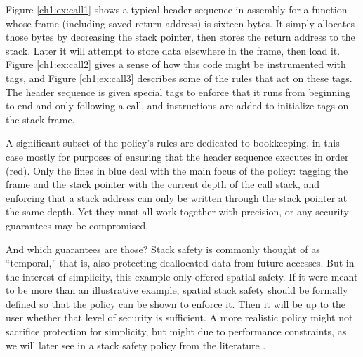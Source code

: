 Figure \ref{ch1:ex:call1} shows a typical header sequence in assembly for a function whose frame
(including saved return address) is sixteen bytes. It simply allocates those bytes by decreasing
the stack pointer, then stores the return address to the stack. Later it will attempt to store data
elsewhere in the frame, then load it. Figure \ref{ch1:ex:call2} gives a sense of how
this code might be instrumented with tags, and Figure \ref{ch1:ex:call3} describes some of
the rules that act on these tags. The header sequence is given special tags to enforce
that it runs from beginning to end and only following a call, and instructions are added
to initialize tags on the stack frame.

A significant subset of the policy's rules are dedicated to bookkeeping, in this case
mostly for purposes of ensuring that the header sequence executes in order (red).
Only the lines in blue deal with the main focus of the policy:
tagging the frame and the stack pointer with the current depth of the call stack, and enforcing
that a stack address can only be written through the stack pointer at the same depth.
Yet they must all work together with precision, or any security guarantees may be compromised.

And which guarantees are those? Stack safety is commonly thought of as ``temporal,'' that is,
also protecting deallocated data from future accesses. But in the interest of simplicity,
this example only offered spatial safety. If it were meant to be more than an illustrative
example, spatial stack safety should be formally defined so that the policy can be shown
to enforce it. Then it will be up to the user whether that level of security is sufficient.
A more realistic policy might not sacrifice protection for simplicity, but might due to
performance constraints, as we will later see in a stack safety policy from the
literature \cite{RoesslerD18}.

